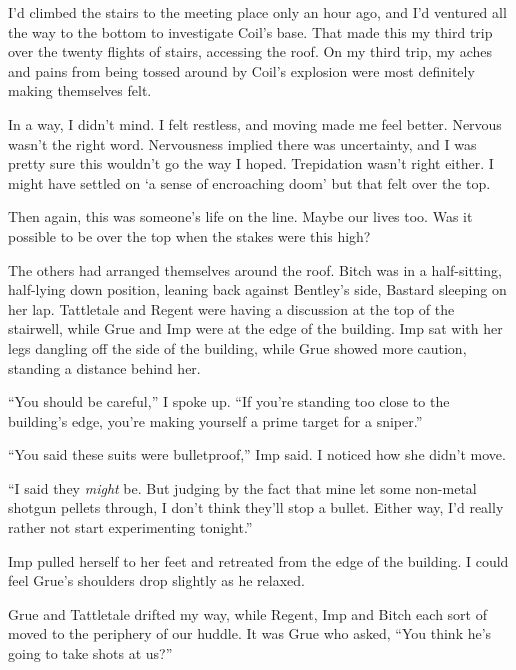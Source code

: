 I'd climbed the stairs to the meeting place only an hour ago, and I'd ventured all the way to the bottom to investigate Coil's base.  That made this my third trip over the twenty flights of stairs, accessing the roof.  On my third trip, my aches and pains from being tossed around by Coil's explosion were most definitely making themselves felt.



In a way, I didn't mind.  I felt restless, and moving made me feel better.  Nervous wasn't the right word.  Nervousness implied there was uncertainty, and I was pretty sure this wouldn't go the way I hoped.  Trepidation wasn't right either.  I might have settled on `a sense of encroaching doom' but that felt over the top.



Then again, this was someone's life on the line.  Maybe our lives too.  Was it possible to be over the top when the stakes were this high?



The others had arranged themselves around the roof.  Bitch was in a half-sitting, half-lying down position, leaning back against Bentley's side, Bastard sleeping on her lap.  Tattletale and Regent were having a discussion at the top of the stairwell, while Grue and Imp were at the edge of the building.  Imp sat with her legs dangling off the side of the building, while Grue showed more caution, standing a distance behind her.



``You should be careful,'' I spoke up.  ``If you're standing too close to the building's edge, you're making yourself a prime target for a sniper.''



``You said these suits were bulletproof,'' Imp said.  I noticed how she didn't move.



``I said they \emph{might} be.  But judging by the fact that mine let some non-metal shotgun pellets through, I don't think they'll stop a bullet.  Either way, I'd really rather not start experimenting tonight.''



Imp pulled herself to her feet and retreated from the edge of the building.  I could feel Grue's shoulders drop slightly as he relaxed.



Grue and Tattletale drifted my way, while Regent, Imp and Bitch each sort of moved to the periphery of our huddle.  It was Grue who asked, ``You think he's going to take shots at us?''



